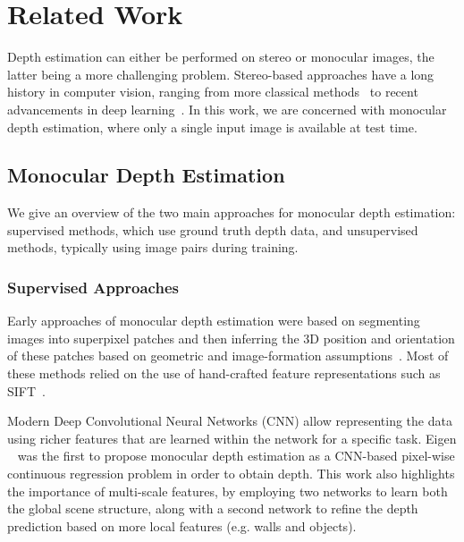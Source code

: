 \section{Related Work}
Depth estimation can either be performed on stereo or monocular images, the latter being a more challenging problem. Stereo-based approaches have a long history in computer vision, ranging from more classical methods~\cite{scharstein2002taxonomy} to recent advancements in deep learning~\cite{zbontar2016stereo}.
In this work, we are concerned with monocular depth estimation, where only a single input image is available at test time.

\subsection{Monocular Depth Estimation}
We give an overview of the two main approaches for monocular depth estimation: supervised methods, which use ground truth depth data, and unsupervised methods, typically using image pairs during training. 

\subsubsection{Supervised Approaches}

Early approaches of monocular depth estimation were based on segmenting images into superpixel patches and then inferring the 3D position and orientation of these patches based on geometric and image-formation assumptions~\cite{saxena2009make3d, Lin2012}. Most of these methods relied on the use of hand-crafted feature representations such as SIFT~\cite{Lin2010}.

Modern Deep Convolutional Neural Networks (CNN) allow representing the data using richer features that are learned within the network for a specific task.
Eigen \etal~\cite{eigen2015predicting, eigen2014depth} was the first to propose monocular depth estimation as a CNN-based pixel-wise continuous regression problem in order to obtain depth.
This work also highlights the importance of multi-scale features, by employing two networks to learn both the global scene structure, along with a second network to refine the depth prediction based on more local features (e.g. walls and objects).  

